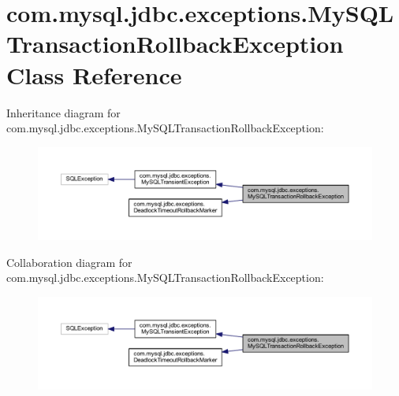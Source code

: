 \hypertarget{classcom_1_1mysql_1_1jdbc_1_1exceptions_1_1_my_s_q_l_transaction_rollback_exception}{}\section{com.\+mysql.\+jdbc.\+exceptions.\+My\+S\+Q\+L\+Transaction\+Rollback\+Exception Class Reference}
\label{classcom_1_1mysql_1_1jdbc_1_1exceptions_1_1_my_s_q_l_transaction_rollback_exception}


Inheritance diagram for com.\+mysql.\+jdbc.\+exceptions.\+My\+S\+Q\+L\+Transaction\+Rollback\+Exception\+:
\nopagebreak
\begin{figure}[H]
\begin{center}
\leavevmode
\includegraphics[width=350pt]{classcom_1_1mysql_1_1jdbc_1_1exceptions_1_1_my_s_q_l_transaction_rollback_exception__inherit__graph}
\end{center}
\end{figure}


Collaboration diagram for com.\+mysql.\+jdbc.\+exceptions.\+My\+S\+Q\+L\+Transaction\+Rollback\+Exception\+:
\nopagebreak
\begin{figure}[H]
\begin{center}
\leavevmode
\includegraphics[width=350pt]{classcom_1_1mysql_1_1jdbc_1_1exceptions_1_1_my_s_q_l_transaction_rollback_exception__coll__graph}
\end{center}
\end{figure}
